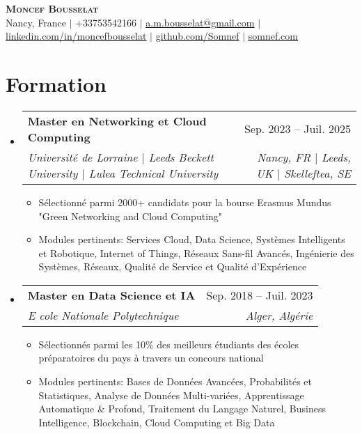 \documentclass[letterpaper,10.5t]{article}
\makeatletter
\newcommand{\resumeItem}[1]{
  \item\small{
    {#1 \vspace{-2pt}}
  }
}
\newcommand{\resumeSubheading}[4]{
  \vspace{-2pt}\item
    \begin{tabular*}{0.97\textwidth}[t]{l@{\extracolsep{\fill}}r}
      \textbf{#1} & #2 \\
      \textit{\small#3} & \textit{\small #4} \\
    \end{tabular*}\vspace{-7pt}
}
\newcommand{\resumeSubHeadingListStart}{\begin{itemize}[leftmargin=0.15in, label={}]}
\newcommand{\resumeSubHeadingListEnd}{\end{itemize}}
\newcommand{\resumeItemListStart}{\begin{itemize}}
\newcommand{\resumeItemListEnd}{\end{itemize}\vspace{-5pt}}
\makeatother
\begin{document}

\begin{center}
    \textbf{\Huge \scshape Moncef Bousselat} \\ \vspace{1pt}
    \small Nancy, France $|$ 
    \small +33753542166 $|$ 
    \href{mailto:a.m.bousselat@gmail.com@gmail.com}{\underline{a.m.bousselat@gmail.com}} $|$ 
    \href{https://www.linkedin.com/in/moncefbousselat/}{\underline{linkedin.com/in/moncefbousselat}} $|$
    \href{https://github.com/Somnef}{\underline{github.com/Somnef}} $|$
    \href{https://www.somnef.com}{\underline{somnef.com}}
\end{center}


\section{Formation}
    \resumeSubHeadingListStart
        \resumeSubheading
        {Master en Networking et Cloud Computing}{Sep. 2023 -- Juil. 2025}
        {Université de Lorraine $|$ Leeds Beckett University $|$ Lulea Technical University}{Nancy, FR $|$ Leeds, UK $|$ Skelleftea, SE}
            \resumeItemListStart
                \resumeItem{Sélectionné parmi 2000+ candidats pour la bourse Erasmus Mundus "Green Networking and Cloud Computing"}
                \resumeItem{Modules pertinents: Services Cloud, Data Science, Systèmes Intelligents et Robotique, Internet of Things, Réseaux Sans-fil Avancés, Ingénierie des Systèmes, Réseaux, Qualité de Service et Qualité d'Expérience}
            \resumeItemListEnd
      
        \resumeSubheading
        {Master en Data Science et IA}{Sep. 2018 -- Juil. 2023}
        {E   cole Nationale Polytechnique}{Alger, Algérie}
            \resumeItemListStart
                \resumeItem{Sélectionnés parmi les 10\% des meilleurs étudiants des écoles préparatoires du pays à travers un concours national}
                \resumeItem{Modules pertinents: Bases de Données Avancées, Probabilités et Statistiques, Analyse de Données Multi-variées, Apprentissage Automatique \& Profond, Traitement du Langage Naturel, Business Intelligence, Blockchain, Cloud Computing et Big Data}
            \resumeItemListEnd
  \resumeSubHeadingListEnd
\end{document}

